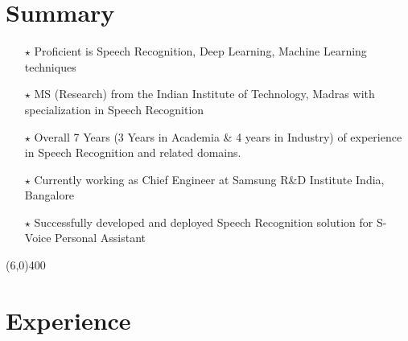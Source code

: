 \documentclass[line,margin]{res}
\begin{document}
\begin{resume} 
\normalsize

\section{Summary}

\begin{itemize} \itemsep -1pt
 \item [$\star$] Proficient is Speech Recognition, Deep Learning, Machine Learning techniques
 \item [$\star$] MS (Research) from the Indian Institute of Technology, Madras with specialization in Speech Recognition
 \item [$\star$] Overall 7 Years (3 Years in Academia \& 4 years in Industry) of experience in Speech Recognition and related domains.
 \item [$\star$] Currently working as Chief Engineer at Samsung R\&D Institute India, Bangalore
 \item [$\star$] Successfully developed and deployed Speech Recognition solution for S-Voice Personal Assistant
\end{itemize}

\vspace{-5mm}
\line(6,0){400}


\section{Experience}


\end{resume}
\end{document}
